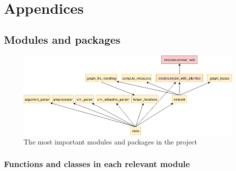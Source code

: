 \appendix
\chapter*{Appendices}\label{sect:Appendices}
\setcounter{chapter}{1}  %
\newcommand{\tab}[1]{\hspace{.1\textwidth}\rlap{#1}}


\section{Modules and packages}
\begin{figure}[!ht]
	\centering
	\includegraphics[width=150mm, keepaspectratio]{figures/packages_GraphTransformations.png}
	\caption{The most important modules and packages in the project}
	\label{fig:packages}
\end{figure}

\subsection{Functions and classes in each relevant module}

